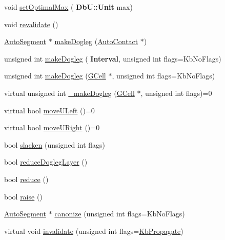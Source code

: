 \begin{DoxyCompactItemize}
\item 
void \mbox{\hyperlink{classKatabatic_1_1AutoSegment_a90173ab4f35b98c6544f9482ccd93b5e}{set\+Optimal\+Max}} (\textbf{ Db\+U\+::\+Unit} max)
\item 
void \mbox{\hyperlink{classKatabatic_1_1AutoSegment_a88ac40c065bce0ff97792d18b41b6a67}{revalidate}} ()
\item 
\mbox{\hyperlink{classKatabatic_1_1AutoSegment}{Auto\+Segment}} $\ast$ \mbox{\hyperlink{classKatabatic_1_1AutoSegment_a39c927c04b5016770692b9b8448c2f04}{make\+Dogleg}} (\mbox{\hyperlink{classKatabatic_1_1AutoContact}{Auto\+Contact}} $\ast$)
\item 
unsigned int \mbox{\hyperlink{classKatabatic_1_1AutoSegment_a5ca22c853ee33a2b26367eaf29457766}{make\+Dogleg}} (\textbf{ Interval}, unsigned int flags=Kb\+No\+Flags)
\item 
unsigned int \mbox{\hyperlink{classKatabatic_1_1AutoSegment_aa21b16647c1750ba8b3eb9d99b12f073}{make\+Dogleg}} (\mbox{\hyperlink{classKatabatic_1_1GCell}{G\+Cell}} $\ast$, unsigned int flags=Kb\+No\+Flags)
\item 
virtual unsigned int \mbox{\hyperlink{classKatabatic_1_1AutoSegment_a37a14b40295ccb50cd5001891385807b}{\+\_\+make\+Dogleg}} (\mbox{\hyperlink{classKatabatic_1_1GCell}{G\+Cell}} $\ast$, unsigned int flags)=0
\item 
virtual bool \mbox{\hyperlink{classKatabatic_1_1AutoSegment_af8ca7b17e952f4b599aeeb2f4e5be395}{move\+U\+Left}} ()=0
\item 
virtual bool \mbox{\hyperlink{classKatabatic_1_1AutoSegment_ad7fd54ca229fcf5ccd99f87b019b9cbc}{move\+U\+Right}} ()=0
\item 
bool \mbox{\hyperlink{classKatabatic_1_1AutoSegment_a1fbc0adb4c0b14632edc7c55f028cd4b}{slacken}} (unsigned int flags)
\item 
bool \mbox{\hyperlink{classKatabatic_1_1AutoSegment_acecc9a1d55a271a4b1587d7872cfe133}{reduce\+Dogleg\+Layer}} ()
\item 
bool \mbox{\hyperlink{classKatabatic_1_1AutoSegment_a27a6a2c747ff93d209878a32d97e9157}{reduce}} ()
\item 
bool \mbox{\hyperlink{classKatabatic_1_1AutoSegment_ace393c3c082a5e62a348168354660e39}{raise}} ()
\item 
\mbox{\hyperlink{classKatabatic_1_1AutoSegment}{Auto\+Segment}} $\ast$ \mbox{\hyperlink{classKatabatic_1_1AutoSegment_a8b0d5044dce091d06b633848a6f8a66d}{canonize}} (unsigned int flags=Kb\+No\+Flags)
\item 
virtual void \mbox{\hyperlink{classKatabatic_1_1AutoSegment_a23599eee5a07af377fbc8d47cda7e7b0}{invalidate}} (unsigned int flags=\mbox{\hyperlink{namespaceKatabatic_a2af2ad6b6441614038caf59d04b3b217a3f95c1f06fe0b58b44ccbc57d99f2a5d}{Kb\+Propagate}})

\end{DoxyCompactItemize}

